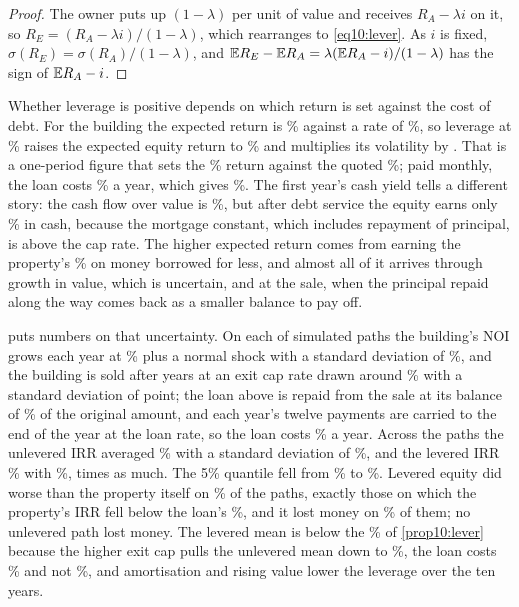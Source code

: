 \begin{chapterrefs}
\begin{proof}
The owner puts up $(1-\lambda)$ per unit of value and receives $R_A-\lambda i$ on it, so
$R_E=(R_A-\lambda i)/(1-\lambda)$, which rearranges to \cref{eq10:lever}. As $i$ is fixed,
$\sigma(R_E)=\sigma(R_A)/(1-\lambda)$, and $\mathbb{E} R_E-\mathbb{E} R_A=\lambda(\mathbb{E} R_A-i)/(1-\lambda)$ has the sign of
$\mathbb{E} R_A-i$.
\end{proof}

Whether leverage is positive depends on which return is set against the cost of debt. For the building
the expected return is \pfR\% against a rate of \lvRate\%, so leverage at \lvLtv\% raises the expected
equity return to \lvLevRet\% and multiplies its volatility by \lvVolMult. That is a one-period figure that sets the \pfR\% return against
the quoted \lvRate\%; paid monthly, the loan costs \lvRateEff\% a year, which gives \lvLevRetEff\%. The first year's cash yield
tells a different story: the cash flow over value is \lvCfYield\%, but after debt service the equity
earns only \lvCashYield\% in cash, because the mortgage constant, which includes repayment of principal,
is above the cap rate. The higher expected return comes from earning the property's \pfR\% on money
borrowed for less, and almost all of it arrives through growth in value, which is uncertain, and at the
sale, when the principal repaid along the way comes back as a smaller balance to pay off.

 puts numbers on that uncertainty. On each of \lvNsim{} simulated paths the
building's NOI grows each year at \pfG\% plus a normal shock with a standard deviation of \lvGsd\%, and
the building is sold after \lvTerm{} years at an exit cap rate drawn around \pfExit\% with a standard
deviation of \lvCapSd{} point; the loan above is repaid from the sale at its balance of \lvBal\% of the
original amount, and each year's twelve payments are carried to the end of the year at the loan rate,
so the loan costs \lvRateEff\% a year. Across the paths the unlevered IRR averaged \lvIuMean\% with a standard deviation of \lvIuSd\%, and the
levered IRR \lvIlMean\% with \lvIlSd\%, \lvSdRatio{} times as much. The 5\% quantile fell from \lvIuQ\%
to \lvIlQ\%. Levered equity did worse than the property itself on \lvPBelow\% of the paths, exactly those
on which the property's IRR fell below the loan's \lvRateEff\%, and it lost money on \lvPLoss\% of them;
no unlevered path lost money. The levered mean is below the \lvLevRet\% of \cref{prop10:lever} because the
higher exit cap pulls the unlevered mean down to \lvIuMean\%, the loan costs \lvRateEff\% and not
\lvRate\%, and amortisation and rising value lower the leverage over the ten years.


\end{chapterrefs}
